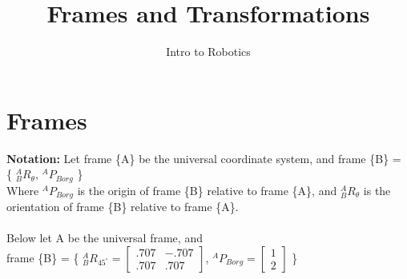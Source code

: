 \documentclass{article}
\title{Frames and Transformations}
\author{Intro to Robotics}
\date{}
\begin{document}
\maketitle

\section{Frames}
\textbf{Notation: } Let frame \{A\} be the universal coordinate system, and frame \{B\} = \{ ${}^{A}_{B}R_\theta$, ${}^{A}P_{Borg}$ \}\\
Where ${}^{A}P_{Borg}$ is the origin of frame \{B\} relative to frame \{A\}, and ${}^{A}_{B}R_\theta$ is the orientation of frame \{B\} relative to frame \{A\}.  \\\\
Below let A be the universal frame, and\\ 
frame \{B\} = \{ ${}^{A}_{B}R_{45^\circ}=$$\begin{bmatrix}
.707 & -.707 \\
.707 & .707
\end{bmatrix}$, 
${}^{A}P_{Borg}=$$\begin{bmatrix}
1 \\
2
\end{bmatrix}$ \}

\\
\end{document}
